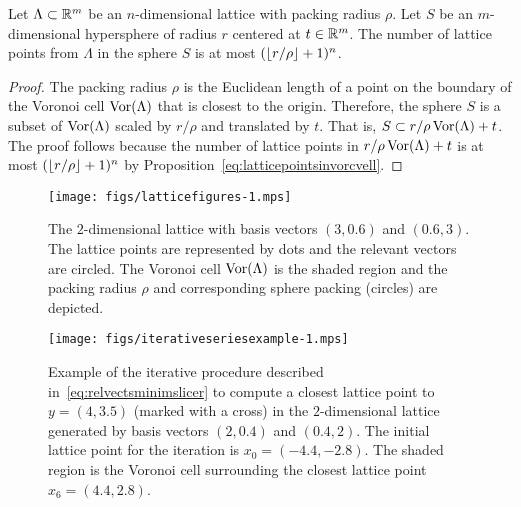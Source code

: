 \documentclass[final,leqno]{siamltex}
\begin{document}
\begin{proposition}\label{eq:latticepointsinsphere}
Let $\Lambda \subset {\mathbb R}^{m}$ be an $n$-dimensional lattice with packing radius $\rho$.  Let $S$ be an $m$-dimensional hypersphere of radius $r$ centered at $t \in {\mathbb R}^{m}$.  The number of lattice points from $\Lambda$ in the sphere $S$ is at most $({\left\lfloor r/\rho \right\rfloor}+1)^{n}$. %
 \end{proposition}
 \begin{proof}
The packing radius $\rho$ is the Euclidean length of a point on the boundary of the Voronoi cell $\operatorname{Vor}(\Lambda)$ that is closest to the origin. Therefore, the sphere $S$ is a subset of $\operatorname{Vor}(\Lambda)$ scaled by $r/\rho$ and translated by $t$.  That is, $S \subset r/\rho \operatorname{Vor}(\Lambda) + t$.  The proof follows because the number of lattice points in $r/\rho \operatorname{Vor}(\Lambda) + t$ is at most $({\left\lfloor r/\rho \right\rfloor}+1)^n$ by Proposition~\ref{eq:latticepointsinvorcvell}.
\end{proof}
 

 
\begin{figure}[p] 
	\centering      
		\texttt{[image: figs/latticefigures-1.mps]} 
		\caption{The $2$-dimensional lattice with basis vectors $(3,0.6)$ and $(0.6,3)$.  The lattice points are represented by dots and the relevant vectors are circled.  The Voronoi cell $\operatorname{Vor}(\Lambda)$ is the shaded region and the packing radius $\rho$ and corresponding sphere packing (circles) are depicted.
}     
		\label{lattices:fig:vorregion}   
\end{figure} 

\begin{figure}[p] 
	\centering      
		\texttt{[image: figs/iterativeseriesexample-1.mps]} 
		\caption{Example of the iterative procedure described in~\eqref{eq:relvectsminimslicer} to compute a closest lattice point to $y = (4,3.5)$ (marked with a cross) in the $2$-dimensional lattice generated by basis vectors $(2,0.4)$ and $(0.4,2)$.  The initial lattice point for the iteration is $x_0 = (-4.4,-2.8)$.  The shaded region is the Voronoi cell surrounding the closest lattice point $x_6 = (4.4,2.8)$.}       
		\label{lattices:fig:iterativeexample} 
\end{figure} 
\end{document}
